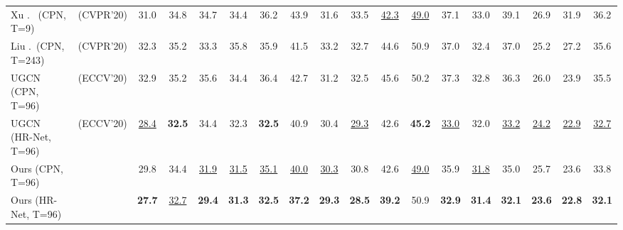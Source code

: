 \documentclass[sigconf]{acmart}
\begin{document}
\begin{table*}[t]
{\begin{tabular}{@{}ll|ccccccccccccccc|c@{}}
			Xu \etal.~\cite{xu2020deep} (CPN, T=9)         & (CVPR'20) &      {31.0}      &      {34.8}      &       34.7       &      {34.4}      &      {36.2}      &       43.9       &      {31.6}      &      {33.5}      & \underline{42.3} & \underline{49.0} &      {37.1}      &      {33.0}      &       39.1       &       26.9       &       31.9       &      {36.2}      \\
			Liu \etal.~\cite{liu2020attention}(CPN, T=243) & (CVPR'20) &       32.3       &       35.2       &       33.3       &       35.8       &       35.9       &       41.5       &       33.2       &       32.7       &       44.6       &       50.9       &       37.0       &       32.4       &       37.0       &       25.2       &       27.2       &       35.6       \\
			UGCN~\cite{wang2020motion} (CPN, T=96)         & (ECCV'20) &       32.9       &       35.2       &       35.6       &       34.4       &       36.4       &       42.7       &       31.2       &       32.5       &       45.6       &       50.2       &       37.3       &       32.8       &       36.3       &       26.0       &       23.9       &       35.5       \\
			UGCN~\cite{wang2020motion} (HR-Net, T=96)      & (ECCV'20) & \underline{28.4} &  \textbf{32.5}   &      {34.4}      &      {32.3}      &  \textbf{32.5}   &      {40.9}      &       30.4       & \underline{29.3} &       42.6       &  \textbf{45.2}   & \underline{33.0} &       32.0       & \underline{33.2} & \underline{24.2} & \underline{22.9} & \underline{32.7} \\ \midrule[0.5pt]
			Ours (CPN, T=96)                               &           &       29.8       &       34.4       & \underline{31.9} & \underline{31.5} & \underline{35.1} & \underline{40.0} & \underline{30.3} &       30.8       &       42.6       & \underline{49.0} &       35.9       & \underline{31.8} &       35.0       &       25.7       &       23.6       &       33.8       \\
			Ours (HR-Net, T=96)                            &           &  \textbf{27.7}   & \underline{32.7} &  \textbf{29.4}   &  \textbf{31.3}   &  \textbf{32.5}   &  \textbf{37.2}   &  \textbf{29.3}   &  \textbf{28.5}   &  \textbf{39.2}   &       50.9       &  \textbf{32.9}   &  \textbf{31.4}   &  \textbf{32.1}   &  \textbf{23.6}   &  \textbf{22.8}   &  \textbf{32.1}   \\ \toprule[1pt]
		\end{tabular}
	}
	\label{table:h36m}
	\vspace{-3mm}
\end{table*}
\end{document}
